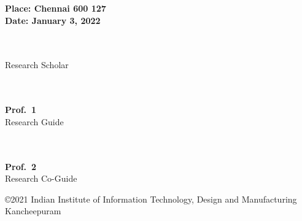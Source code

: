 \hspace*{-0.25in}
\parbox{2.5in}{
	\noindent \bf Place: Chennai 600 127\\
	\noindent \bf Date: January 3, 2022 \\ 
}
\hspace*{1.0in}
\parbox{2.5in}{
			\noindent \\
	\noindent \textbf{\MyAuthor} \\
	\noindent Research Scholar \\
}
\hspace*{3.55in}
\parbox{2.5in}{
	\noindent \\
	\noindent \\
	\noindent \textbf{Prof.~1} \\
	\noindent Research Guide \\ %
}
\hspace*{3.55in}
\parbox{2.5in}{
	\noindent \\
	\noindent \\
	\noindent \textbf{Prof.~2} \\
	\noindent Research Co-Guide \\ %
}



\vfill
\raggedbottom
\noindent
\copyright 2021 Indian Institute of Information Technology, Design and Manufacturing Kancheepuram